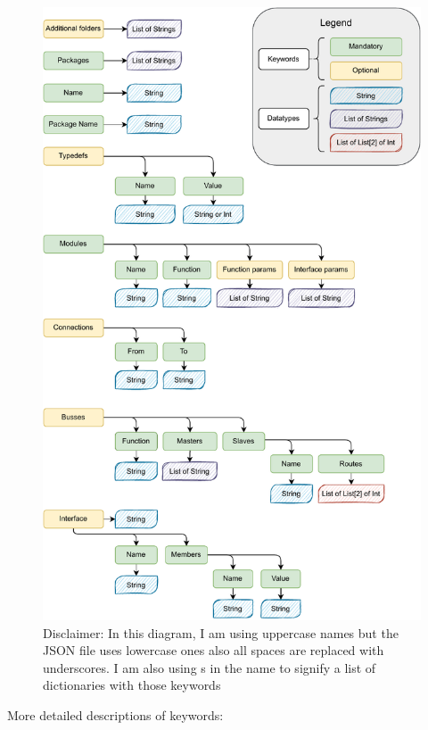 \documentclass[12pt]{report}
\begin{document}
\begin{figure}[H]
    \centering
\includegraphics[width=0.70\columnwidth]{pdfExports/LargeMapJSON.pdf}

\caption{Disclaimer: In this diagram, I am using uppercase names but the JSON file uses lowercase ones also all spaces are replaced with underscores. I am also using s in the name to signify a list of dictionaries with those keywords}

\end{figure}
\newpage
More detailed descriptions of keywords: 
\end{document}
